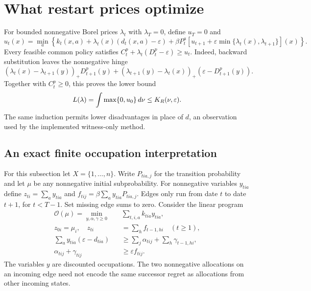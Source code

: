 \section{What restart prices optimize}\label{sec:dual48}
For bounded nonnegative Borel prices $\lambda_t$ with $\lambda_T=0$, define $u_T=0$ and
\begin{equation}\label{eq:price48}
 u_t(x)=\min_a\left\{k_t(x,a)+\lambda_t(x)(d_t(x,a)-\varepsilon)
 +\beta P_t^a\!\left[u_{t+1}+\varepsilon\min\{\lambda_t(x),\lambda_{t+1}\}\right](x)\right\}.
\end{equation}
Every feasible common policy satisfies $C_t^p+\lambda_t(D_t^p-\varepsilon)\ge u_t$. Indeed, backward substitution leaves the nonnegative hinge
\[
 (\lambda_t(x)-\lambda_{t+1}(y))_+D_{t+1}^p(y)
 +(\lambda_{t+1}(y)-\lambda_t(x))_+(\varepsilon-D_{t+1}^p(y)).
\]
Together with $C_t^p\ge0$, this proves the lower bound
\begin{equation}\label{eq:clipped48}
 L(\lambda)=\int\max\{0,u_0\}\,d\nu\le K_R(\nu,\varepsilon).
\end{equation}
The same induction permits lower disadvantages in place of $d$, an observation used by the implemented witness-only method.

\subsection{An exact finite occupation interpretation}
For this subsection let $X=\{1,\ldots,n\}$. Write $P_{tia,j}$ for the transition probability and let $\mu$ be any nonnegative initial subprobability. For nonnegative variables $y_{tia}$ define $z_{ti}=\sum_a y_{tia}$ and $f_{tij}=\beta\sum_a y_{tia}P_{tia,j}$. Edges only run from date $t$ to date $t+1$, for $t<T-1$. Set missing edge sums to zero. Consider the linear program
\begin{align}
 \mathcal O(\mu)=\min_{y,\alpha,\gamma\ge0}\quad&\sum_{t,i,a}k_{tia}y_{tia},\label{eq:occupation48}\\
 z_{0i}=\mu_i,\quad z_{ti}&=\sum_h f_{t-1,hi}\quad(t\ge1),\nonumber\\
 \sum_a y_{tia}(\varepsilon-d_{tia})&\ge\sum_j\alpha_{tij}+\sum_h\gamma_{t-1,hi},\label{eq:budget48}\\
 \alpha_{tij}+\gamma_{tij}&\ge\varepsilon f_{tij}.\label{eq:edge48}
\end{align}
The variables $y$ are discounted occupations. The two nonnegative allocations on an incoming edge need not encode the same successor regret as allocations from other incoming states.

